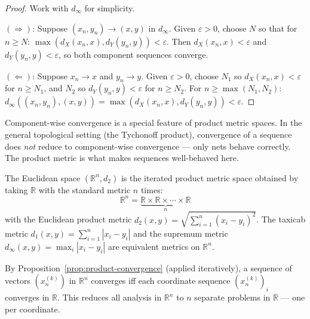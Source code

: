 \begin{proof}
Work with $d_\infty$ for simplicity.

$(\Rightarrow)$: Suppose $(x_n, y_n) \to (x, y)$ in $d_\infty$.
Given $\varepsilon > 0$, choose $N$ so that for $n \ge N$:
$\max(d_X(x_n,x), d_Y(y_n,y)) < \varepsilon$.
Then $d_X(x_n,x) < \varepsilon$ and $d_Y(y_n,y) < \varepsilon$, so both
component sequences converge.

$(\Leftarrow)$: Suppose $x_n \to x$ and $y_n \to y$.
Given $\varepsilon > 0$, choose $N_1$ so $d_X(x_n,x) < \varepsilon$ for
$n \ge N_1$, and $N_2$ so $d_Y(y_n,y) < \varepsilon$ for $n \ge N_2$.
For $n \ge \max(N_1, N_2)$:
$d_\infty((x_n,y_n),(x,y)) = \max(d_X(x_n,x), d_Y(y_n,y)) < \varepsilon$.
\end{proof}

\begin{remark*}
Component-wise convergence is a special feature of product metric spaces.
In the general topological setting (the Tychonoff product), convergence
of a sequence does \emph{not} reduce to component-wise convergence
--- only nets behave correctly.
The product metric is what makes sequences well-behaved here.
\end{remark*}


\begin{proposition}
\label{prop:Rn-as-product}
The Euclidean space $(\mathbb{R}^n, d_2)$ is the iterated product metric
space obtained by taking $\mathbb{R}$ with the standard metric $n$ times:
\[
\mathbb{R}^n = \underbrace{\mathbb{R} \times \mathbb{R} \times \cdots \times \mathbb{R}}_{n}
\]
with the Euclidean product metric
$d_2(x,y) = \sqrt{\sum_{i=1}^n (x_i - y_i)^2}$.
The taxicab metric $d_1(x,y) = \sum_{i=1}^n |x_i - y_i|$
and the supremum metric $d_\infty(x,y) = \max_i |x_i - y_i|$
are equivalent metrics on $\mathbb{R}^n$.
\end{proposition}

\begin{remark*}
By Proposition~\ref{prop:product-convergence} (applied iteratively),
a sequence of vectors $(x_n^{(k)})$ in $\mathbb{R}^n$ converges iff
each coordinate sequence $(x_n^{(k)})_i$ converges in $\mathbb{R}$.
This reduces all analysis in $\mathbb{R}^n$ to $n$ separate problems
in $\mathbb{R}$ --- one per coordinate.
\end{remark*}


